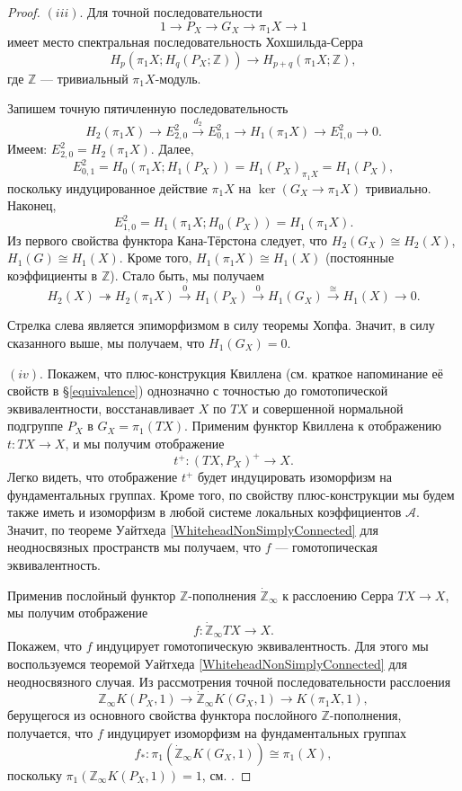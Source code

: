 \documentclass[14pt, dvipsnames, twoside]{extarticle}
\theoremstyle{definition}
\theoremstyle{remark}
\begin{document}
\begin{proof} $(iii)$. Для точной последовательности $$1\to P_X\to G_X\to \pi_1X\to 1$$ имеет место спектральная последовательность Хохшильда-Серра $$H_p(\pi_1X; H_q(P_X; \mathbb{Z}))\rightarrow H_{p+q}(\pi_1X; \mathbb{Z}),$$ где $\mathbb{Z}$ --- тривиальный $\pi_1X$-модуль.

Запишем точную пятичленную последовательность $$H_2(\pi_1X)\to E^2_{2,0}\overset{d_{2}}{\to} E^2_{0, 1}\to H_1(\pi_1X)\to E^2_{1, 0}\to 0.$$ Имеем: $E^2_{2,0} = H_2(\pi_1X)$. Далее, $$E^2_{0,1} = H_0(\pi_1X; H_1(P_X)) = H_1(P_X)_{\pi_1X} = H_1(P_X),$$ поскольку индуцированное действие $\pi_1X$ на $\ker(G_X\to \pi_1X)$ тривиально. Наконец, $$E^2_{1,0} = H_1(\pi_1X; H_0(P_X)) = H_1(\pi_1X).$$ Из первого свойства функтора Кана-Тёрстона следует, что $H_2(G_X)\cong H_2(X)$, $H_1(G)\cong H_1(X)$. Кроме того, $H_1(\pi_1X)\cong H_1(X)$ (постоянные коэффициенты в $\mathbb{Z}$). Стало быть, мы получаем $$H_2(X)\twoheadrightarrow H_2(\pi_1X)\overset{0}{\to} H_1(P_X)\overset{0}{\to} H_1(G_X)\overset{\cong}{\to} H_1(X)\to 0.$$

Стрелка слева является эпиморфизмом в силу теоремы Хопфа. Значит, в силу сказанного выше, мы получаем, что $H_1(G_X) = 0$. 



$(iv)$. Покажем, что плюс-конструкция Квиллена (см. краткое напоминание её свойств в \S\ref{equivalence}) однозначно с точностью до гомотопической эквивалентности, восстанавливает $X$ по $TX$ и совершенной нормальной подгруппе $P_X$ в $G_X = \pi_1(TX)$. Применим функтор Квиллена к отображению $t: TX\to X$, и мы получим отображение $$t^{+}: (TX, P_X)^{+}\to X.$$ Легко видеть, что отображение $t^{+}$ будет индуцировать изоморфизм на фундаментальных группах. Кроме того, по свойству плюс-конструкции мы будем также иметь и изоморфизм в любой системе локальных коэффициентов $\mathcal{A}$. Значит, по теореме Уайтхеда \ref{WhiteheadNonSimplyConnected} для неодносвязных пространств мы получаем, что $f$ --- гомотопическая эквивалентность.




Применив послойный функтор $\mathbb{Z}$-пополнения $\dot{\mathbb{Z}}_\infty$ к расслоению Серра $TX\to X$, мы получим отображение $$f: \dot{\mathbb{Z}}_\infty TX\to X.$$ Покажем, что $f$ индуцирует гомотопическую эквивалентность. Для этого мы воспользуемся теоремой Уайтхеда \ref{WhiteheadNonSimplyConnected} для неодносвязного случая. Из рассмотрения точной последовательности расслоения $$\mathbb{Z}_\infty K(P_X,1)\to \dot{\mathbb{Z}}_\infty K(G_X, 1)\to K(\pi_1X, 1),$$ берущегося из основного свойства функтора послойного $\mathbb{Z}$-пополнения, получается, что $f$ индуцирует изоморфизм на фундаментальных группах $$f_\ast: \pi_1(\dot{\mathbb{Z}}_\infty K(G_X, 1))\cong \pi_1(X),$$ поскольку $\pi_1(\mathbb{Z}_\infty K(P_X, 1)) = 1$, см. \cite{BousfieldKan}.


\end{proof}
\end{document}
